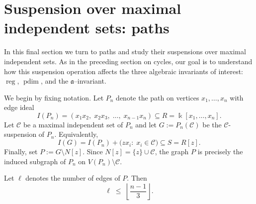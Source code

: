 \documentclass[12pt]{amsart}
\theoremstyle{plain}
\theoremstyle{definition}
\DeclareMathOperator{\reg}{reg}
\DeclareMathOperator{\pdim}{pdim}
\begin{document}
\section{Suspension over maximal independent sets:  paths}\label{sec:paths}

In this final section we turn to paths and study their suspensions over maximal independent sets. As in the preceding section on cycles, our goal is to understand how this suspension operation affects the three algebraic invariants of interest: $\reg$, $\pdim$, and the $\mathfrak a$--invariant.

We begin by fixing notation. Let $P_n$ denote the path on vertices $x_1,\ldots,x_n$ with edge ideal
\[
I(P_n)=(x_1x_2,\;x_2x_3,\;\ldots,\;x_{n-1}x_n)\subseteq R=\Bbbk[x_1,\ldots,x_n].
\]
Let $\mathcal{C}$ be a maximal independent set of $P_n$ and let $G:=P_n(\mathcal{C})$ be the $\mathcal{C}$-suspension of $P_n$. Equivalently,
\[
I(G)= I(P_n)+\bigl(zx_i:\; x_i\in \mathcal{C}\bigr)\subseteq S=R[z].
\]
Finally, set $P:=G\setminus N[z]$. Since $N[z]=\{z\}\cup \mathcal{C}$, the graph $P$ is precisely the induced subgraph of $P_n$ on $V(P_n)\setminus \mathcal{C}$.

\begin{lem}\label{lem:number-edges-P}
Let  $\ell$ denotes the number of edges of $P$. Then
\[
\ell \;\le\; \left\lfloor \frac{n-1}{3} \right\rfloor.
\]
\end{lem}
\end{document}
